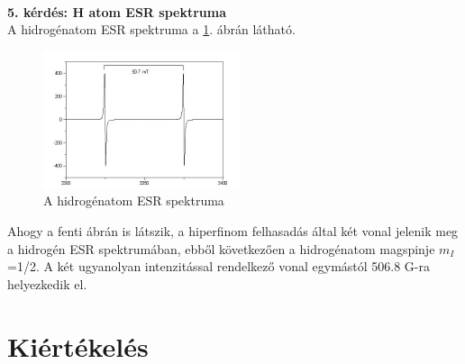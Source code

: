 \documentclass[12pt,a4paper]{article}
\begin{document}
\\
\textbf{5. kérdés: H atom ESR spektruma}\\
A hidrogénatom ESR spektruma a \ref{im-h}. ábrán látható.\\
\begin{figure}[!h]
\centering
\includegraphics[scale=3]{h_spec}
\caption{A hidrogénatom ESR spektruma}
\label{im-h}
\end{figure}
\newline
Ahogy a fenti ábrán is látszik, a hiperfinom felhasadás által két vonal jelenik meg a hidrogén ESR spektrumában, ebből következően a hidrogénatom magspinje $m_I$=1/2. A két ugyanolyan intenzitással rendelkező vonal egymástól 506.8 G-ra helyezkedik el.

\section{Kiértékelés}
\end{document}
